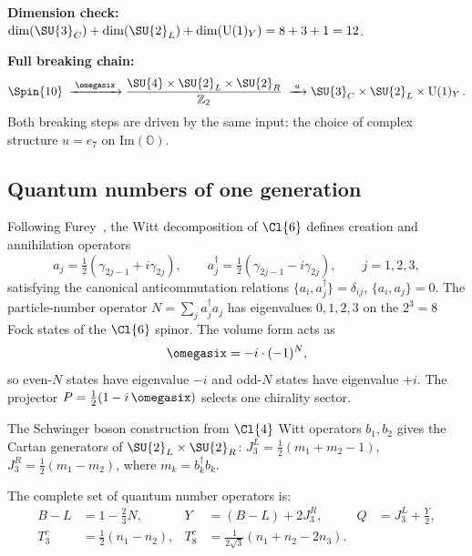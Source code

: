 \noindent\textbf{Dimension check:}
$\dim(\SU{3}_C) + \dim(\SU{2}_L) + \dim(\mathrm{U}(1)_Y)
= 8 + 3 + 1 = 12$.\ \checkmark

\noindent\textbf{Full breaking chain:}
\begin{equation}\label{eq:breaking-chain}
  \Spin{10}
  \;\xrightarrow{\;\omegasix\;}
  \frac{\SU{4}\times\SU{2}_L\times\SU{2}_R}{\mathbb{Z}_2}
  \;\xrightarrow{\;u\;}
  \SU{3}_C\times\SU{2}_L\times\mathrm{U}(1)_Y\,.
\end{equation}
Both breaking steps are driven by the same input: the choice of
complex structure $u = e_7$ on $\mathrm{Im}(\mathbb{O})$.

\subsection{Quantum numbers of one generation}\label{sec:quantum-numbers}

Following Furey~\cite{Furey2018}, the Witt decomposition of $\Cl{6}$
defines creation and annihilation operators
\begin{equation}\label{eq:witt}
  a_j = \tfrac{1}{2}(\gamma_{2j-1} + i\gamma_{2j}),
  \qquad
  a_j^\dagger = \tfrac{1}{2}(\gamma_{2j-1} - i\gamma_{2j}),
  \qquad j=1,2,3,
\end{equation}
satisfying the canonical anticommutation relations
$\{a_i,a_j^\dagger\} = \delta_{ij}$, $\{a_i,a_j\}=0$.
The particle-number operator $N = \sum_j a_j^\dagger a_j$ has
eigenvalues $0,1,2,3$ on the $2^3 = 8$ Fock states of the $\Cl{6}$
spinor.  The volume form acts as
\begin{equation}\label{eq:omega6-witt}
  \omegasix = -i\cdot(-1)^N,
\end{equation}
so even-$N$ states have eigenvalue $-i$ and odd-$N$ states have
eigenvalue $+i$.  The projector $P = \tfrac{1}{2}(1-i\,\omegasix)$
selects one chirality sector.

The Schwinger boson construction from $\Cl{4}$ Witt operators
$b_1,b_2$ gives the Cartan generators of $\SU{2}_L\times\SU{2}_R$:
$J_3^L = \tfrac{1}{2}(m_1+m_2-1)$, $J_3^R = \tfrac{1}{2}(m_1-m_2)$,
where $m_k = b_k^\dagger b_k$.

The complete set of quantum number operators is:
\begin{align}
  B-L &= 1 - \tfrac{2}{3}N,
  &  Y &= (B-L) + 2J_3^R,
  &  Q &= J_3^L + \tfrac{Y}{2},
  \label{eq:qn-ops} \\
  T_3^c &= \tfrac{1}{2}(n_1 - n_2),
  &  T_8^c &= \tfrac{1}{2\sqrt{3}}(n_1 + n_2 - 2n_3).
  &
  \label{eq:color-ops}
\end{align}


